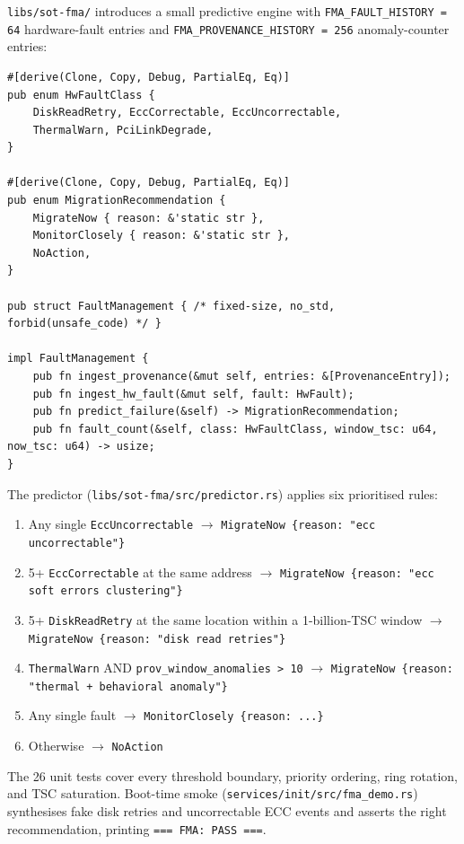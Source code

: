 \documentclass[11pt,a4paper]{article}
\begin{document}
\texttt{libs/sot-fma/} introduces a small predictive engine with
\texttt{FMA\_FAULT\_HISTORY = 64} hardware-fault entries and
\texttt{FMA\_PROVENANCE\_HISTORY = 256} anomaly-counter entries:

\begin{lstlisting}
#[derive(Clone, Copy, Debug, PartialEq, Eq)]
pub enum HwFaultClass {
    DiskReadRetry, EccCorrectable, EccUncorrectable,
    ThermalWarn, PciLinkDegrade,
}

#[derive(Clone, Copy, Debug, PartialEq, Eq)]
pub enum MigrationRecommendation {
    MigrateNow { reason: &'static str },
    MonitorClosely { reason: &'static str },
    NoAction,
}

pub struct FaultManagement { /* fixed-size, no_std, forbid(unsafe_code) */ }

impl FaultManagement {
    pub fn ingest_provenance(&mut self, entries: &[ProvenanceEntry]);
    pub fn ingest_hw_fault(&mut self, fault: HwFault);
    pub fn predict_failure(&self) -> MigrationRecommendation;
    pub fn fault_count(&self, class: HwFaultClass, window_tsc: u64, now_tsc: u64) -> usize;
}
\end{lstlisting}

The predictor (\texttt{libs/sot-fma/src/predictor.rs}) applies six
prioritised rules:

\begin{enumerate}[leftmargin=1.6em,itemsep=0.2em]
  \item Any single \texttt{EccUncorrectable} $\to$
        \texttt{MigrateNow \{reason: "ecc uncorrectable"\}}
  \item 5+ \texttt{EccCorrectable} at the same address $\to$
        \texttt{MigrateNow \{reason: "ecc soft errors clustering"\}}
  \item 5+ \texttt{DiskReadRetry} at the same location within
        a 1-billion-TSC window $\to$
        \texttt{MigrateNow \{reason: "disk read retries"\}}
  \item \texttt{ThermalWarn} AND \texttt{prov\_window\_anomalies > 10} $\to$
        \texttt{MigrateNow \{reason: "thermal + behavioral anomaly"\}}
  \item Any single fault $\to$ \texttt{MonitorClosely \{reason: ...\}}
  \item Otherwise $\to$ \texttt{NoAction}
\end{enumerate}

The 26 unit tests cover every threshold boundary, priority ordering,
ring rotation, and TSC saturation. Boot-time smoke
(\texttt{services/init/src/fma\_demo.rs}) synthesises fake disk
retries and uncorrectable ECC events and asserts the right
recommendation, printing \verb|=== FMA: PASS ===|.
\end{document}
